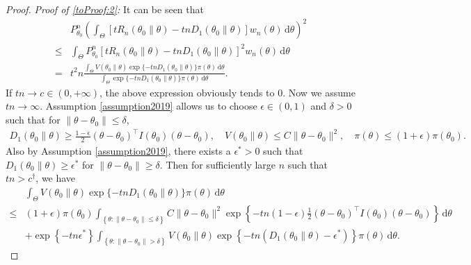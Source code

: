 \documentclass[11pt]{article}
\theoremstyle{plain}
\theoremstyle{definition}
\theoremstyle{remark}
\begin{document}
\begin{appendices}
\begin{proof}
\noindent\emph{Proof of \eqref{toProof:2}:}
It can be seen that
\begin{align*}
    &
    P_{\theta_0}^n
    \left( 
    \int_{\Theta}
    \left[   t R_n(\theta_0\| \theta) - tn D_1 (\theta_0 \| \theta )  \right]
    w_n (\theta) \, \mathrm d \theta
    \right)^2
    \\
    \leq&
    \int_{\Theta}
    P_{\theta_0}^n
    \left[   t R_n(\theta_0\| \theta) - tn D_1 (\theta_0 \| \theta )  \right]^2
    w_n (\theta) \, \mathrm d \theta
    \\
    =&
        t^2 n
           \frac{
    \int_{\Theta}
     V(\theta_0 \| \theta)
               \exp\{ -t n D_1\left( \theta_0 \| \theta \right) \} \pi(\theta)
     \, \mathrm d \theta
           }{
               \int_{\Theta} \exp\{ -t n D_1\left( \theta_0 \| \theta \right) \} \pi(\theta) \, \mathrm d \theta
           }
           .
\end{align*}
If $tn \to c \in (0,+\infty)$, the above expression obviously tends to $0$.
Now we assume $tn \to \infty$.
Assumption \ref{assumption2019} allows us to choose $\epsilon \in (0,1)$ and $\delta>0$ such that  for $\|\theta- \theta_0\| \leq \delta$,
\begin{align*}
    D_1(\theta_0 \| \theta) \geq  \frac{1-\epsilon}{2} (\theta- \theta_0)^\top I(\theta_0) (\theta - \theta_0),
    \quad
    V(\theta_0 \| \theta) \leq C\|\theta - \theta_0\|^2
    ,\quad
    \pi(\theta) \leq (1+\epsilon) \pi(\theta_0)
    .
\end{align*}
Also by Assumption \ref{assumption2019}, there exists a $\epsilon^* > 0$ such that $D_1(\theta_0 \|\theta) \geq \epsilon^*$ for $\|\theta - \theta_0\| \geq \delta$.
Then for sufficiently large $n$ such that $tn > c^\dagger$, we have
\begin{align*}
    &
    \int_{\Theta}
     V(\theta_0 \| \theta)
               \exp\{ -t n D_1\left( \theta_0 \| \theta \right) \} \pi(\theta)
     \, \mathrm d \theta
     \\
     \leq&
    (1+\epsilon) \pi(\theta_0)
     \int_{ \left\{ \theta: \|\theta- \theta_0\| \leq \delta \right\}}
     C\|\theta - \theta_0\|^2
     \exp\left\{ -t n (1-\epsilon) \frac{1}{2} \left( \theta - \theta_0 \right)^\top I(\theta_0) (\theta- \theta_0) \right\} 
     \, \mathrm d \theta
     \\
     &+
     \exp\left\{ -tn \epsilon^* \right\} 
     \int_{\left\{ \theta: \|\theta- \theta_0\| > \delta \right\}} V(\theta_0 \| \theta) \exp\left\{ -tn \left( D_1 \left( \theta_0 \| \theta \right) - \epsilon^* \right) \right\} \pi(\theta) \, \mathrm d \theta.

\end{align*}
\end{proof}
\end{appendices}
\end{document}
